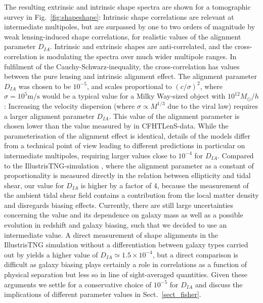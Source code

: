\documentclass[a4paper,fleqn,usenatbib]{mnras}
\begin{document}
The resulting extrinsic and intrinsic shape spectra are shown for a tomographic survey in Fig.~\ref{fig:shapeshape}: Intrinsic shape correlations are relevant at intermediate multipoles, but are surpassed by one to two orders of magnitude by weak lensing-induced shape correlations, for realistic values of the alignment parameter $D_{IA}$. Intrinsic and extrinsic shapes are anti-correlated, and the cross-correlation is modulating the spectra over much wider multipole ranges. In fulfilment of the Cauchy-Schwarz-inequality, the cross-correlation has values between the pure lensing and intrinsic alignment effect. The alignment parameter $D_{IA}$ was chosen to be $10^{-5}$, and scales proportional to $(c/\sigma)^2$, where $\sigma=10^5\mathrm{m}/\mathrm{s}$ would be a typical value for a Milky Way-sized object with $10^{12} M_\odot/h$: Increasing the velocity dispersion (where $\sigma\propto M^{1/3}$ due to the viral law) requires a larger alignment parameter $D_{IA}$. This value of the alignment parameter is chosen lower than the value measured by \citet{tugendhat_angular_2018} in CFHTLenS-data. While the parameterisation of the alignment effect is identical, details of the models differ from a technical point of view \citep[][who compute the correlations in real-space before Fourier-transforming into Fourier-space, whereas our model is set up entirely in Fourier-space]{tugendhat_angular_2018} leading to different predictions in particular on intermediate multipoles, requiring larger values close to $10^{-4}$ for $D_{IA}$. Compared to the IllustrisTNG-simulation \citep{Zjupa_tng_2020}, where the alignment parameter as a constant of proportionality is measured directly in the relation between ellipticity and tidal shear, our value for $D_{IA}$ is higher by a factor of 4, because the measurement of the ambient tidal shear field contains a contribution from the local matter density and disregards biasing effects. Currently, there are still large uncertainties concerning the value and its dependence on galaxy mass as well as a possible evolution in redshift and galaxy biasing, such that we decided to use an intermediate value. A direct measurement of shape alignments in the IllustrisTNG simulation without a differentiation between galaxy types carried out by \citet{hilbert_intrinsic_2016} yields a higher value of $D_{IA}\simeq1.5\times10^{-4}$, but a direct comparison is difficult as galaxy biasing plays certainly a role in correlations as a function of physical separation but less so in line of sight-averaged quantities. Given these arguments we settle for a conservative choice of $10^{-5}$ for $D_{IA}$ and discuss the implications of different parameter values in Sect.~\ref{sect_fisher}.
\end{document}
